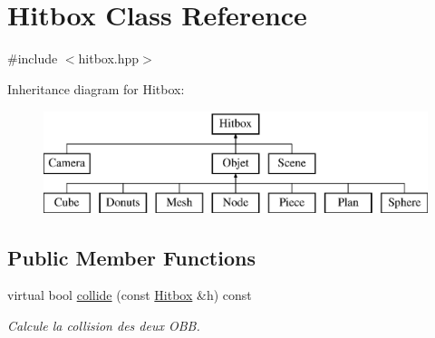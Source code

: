 \hypertarget{class_hitbox}{\section{Hitbox Class Reference}
\label{class_hitbox}
}


{\ttfamily \#include $<$hitbox.\+hpp$>$}

Inheritance diagram for Hitbox\+:\begin{figure}[H]
\begin{center}
\leavevmode
\includegraphics[height=3.000000cm]{class_hitbox}
\end{center}
\end{figure}
\subsection*{Public Member Functions}
\begin{DoxyCompactItemize}
\item 
virtual bool \hyperlink{class_hitbox_a10182e2ac66fd9e2ff07e9c8bf6c0a1c}{collide} (const \hyperlink{class_hitbox}{Hitbox} \&h) const 
\begin{DoxyCompactList}\small\item\em Calcule la collision des deux O\+B\+B. \end{DoxyCompactList}\end{DoxyCompactItemize}
